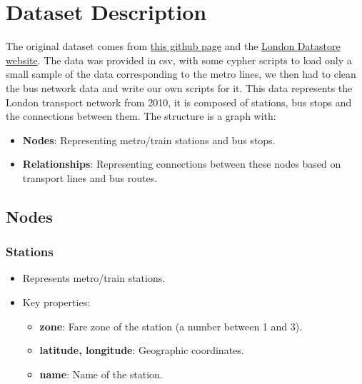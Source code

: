 \documentclass{Configuration_Files/PoliMi3i_thesis}
\begin{document}
\section{Dataset Description}
The original dataset comes from \href{https://github.com/neo4j-partners/neo4j-transport-for-london/tree/main}{this github page} and the \href{https://data.london.gov.uk/dataset/tfl-bus-stop-locations-and-routes}{London Datastore website}. The data was provided in csv, with some cypher scripts to load only a small sample of the data corresponding to the metro lines, we then had to clean the bus network data and write our own scripts for it.
This data represents the London transport network from 2010, it is composed of stations, bus stops and the connections between them. The structure is a graph with:
\begin{itemize}
    \item \textbf{Nodes}: Representing metro/train stations and bus stops.
    \item \textbf{Relationships}: Representing connections between these nodes based on transport lines and bus routes.
\end{itemize}

\subsection*{Nodes}
\subsubsection*{Stations}
\begin{itemize}
    \item Represents metro/train stations.
    \item Key properties:
          \begin{itemize}
              \item \textbf{zone}: Fare zone of the station (a number between 1 and 3).
              \item \textbf{latitude, longitude}: Geographic coordinates.
              \item \textbf{name}: Name of the station.
          \end{itemize}
\end{itemize}
\end{document}
